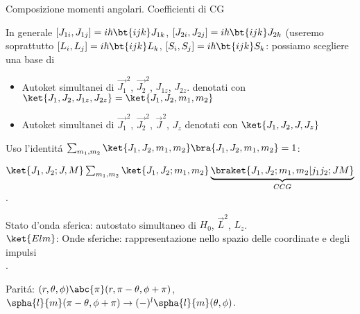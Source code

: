 \begin{frame}{Composizione momenti angolari. Coefficienti di CG}

In generale $[J_{1i}, J_{1j}]=i\hbar\bt{ijk} J_{1k}$, $[J_{2i}, J_{2j}]=i\hbar \bt{ijk} J_{2k}$ (useremo soprattutto  $[L_i,L_j]=i\hbar \bt{ijk} L_k$, $[S_i,S_j]=i\hbar\bt{ijk} S_k$: possiamo scegliere una base di
\begin{itemize}
\item Autoket simultanei di $\vec{J_1}^2$, $\vec{J_2}^2$, $J_{1z}$, $J_{2z}$.
 denotati con $\ket{J_1,J_2,J_{1z},J_{2z}}=\ket{J_1,J_2,m_1,m_2}$ 
\item Autoket simultanei di $\vec{J_1}^2$, $\vec{J_2}^2$, $\vec{J}^2$, $J_z$
 denotati con $\ket{J_1,J_2,J,J_z}$ 
\end{itemize}
Uso l'identit\'a $\sum_{m_1,m_2}\ket{J_1,J_2,m_1,m_2}\bra{J_1,J_2,m_1,m_2}=1$:

$\ket{J_1,J_2;J,M}\sum_{m_1,m_2}\ket{J_1,J_2;m_1,m_2}\underbrace{\braket{J_1,J_2;m_1,m_2|j_1j_2;JM}}_{CCG}$.

Stato d'onda sferica: autostato simultaneo di $H_0$, $\vec{L}^2$, $L_z$.\\
$\ket{Elm}$: Onde sferiche: rappresentazione nello spazio delle coordinate e degli impulsi\\
.

Parit\'a: $(r,\theta,\phi)\abc{\pi}(r,\pi-\theta,\phi+\pi)$, $\spha{l}{m}(\pi-\theta,\phi+\pi)\rightarrow(-)^l\spha{l}{m}(\theta,\phi)$.

\end{frame}

